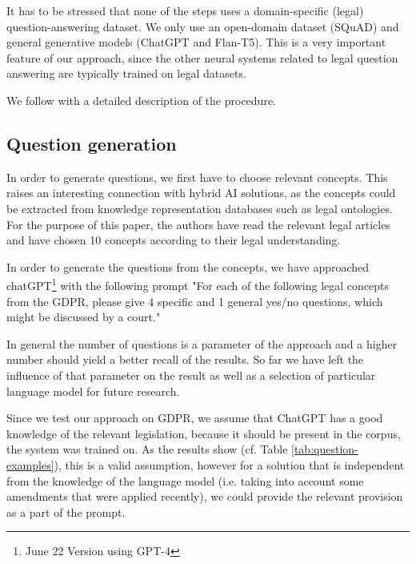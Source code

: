 It has to be stressed that none of the steps uses a domain-specific (legal) question-answering dataset. We only use an open-domain dataset (SQuAD) and general generative models (ChatGPT and Flan-T5). This is a very important feature of our approach,
since the other neural systems related to legal question answering are typically trained on legal datasets.

We follow with a detailed description of the procedure.

\subsection{Question generation}

In order to generate questions, we first have to choose relevant concepts. This raises an interesting connection with hybrid AI solutions, as the concepts could be extracted from knowledge representation databases such as legal ontologies. For the purpose of this paper, the authors have read the relevant legal articles and have chosen 10 concepts according to their legal understanding.

In order to generate the questions from the concepts, we have approached chatGPT\footnote{June 22 Version using GPT-4} with the following prompt "For each of the following legal concepts from the GDPR, please give 4 specific and 1 general yes/no questions, which might be discussed by a court."

In general the number of questions is a parameter of the approach and a higher number
should yield a better recall of the results. So far we have left the influence of that parameter on the result as well as a selection of particular language model for future research.

Since we test our approach on GDPR, we assume that ChatGPT has a good knowledge of the relevant legislation, because it should be present in the corpus, the system was trained on. As the results show (cf. Table \ref{tab:question-examples}), this is a valid assumption, however for a solution that is independent from the knowledge of the language model (i.e. taking into account some amendments that were applied recently), we could provide the
relevant provision as a part of the prompt.

